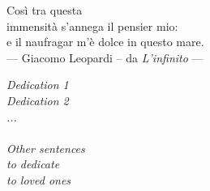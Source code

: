 \thispagestyle{empty}
\vspace*{3cm}

\begin{center}
Così tra questa \\
immensità s'annega il pensier mio: \\
e il naufragar m'è dolce in questo mare. \\
--- Giacomo Leopardi -- da \emph{L'infinito} ---
\end{center}

\medskip

\begin{center}
\hfill \emph{Dedication 1} \\
\hfill \emph{Dedication 2} \\
\hfill \emph{...} \\
~ \\
\hfill \emph{Other sentences} \\
\hfill \emph{to dedicate} \\
\hfill \emph{to loved ones} \\
\end{center}